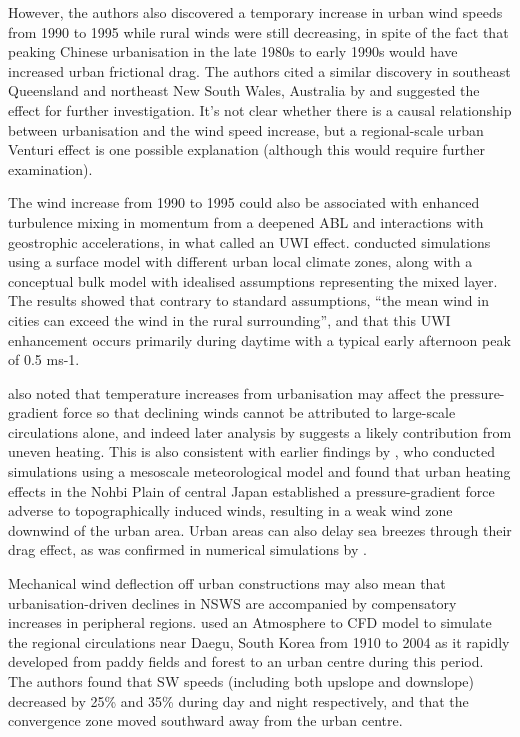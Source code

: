 However, the authors also discovered a temporary increase in urban wind speeds from 1990 to 1995 while rural winds were still decreasing, in spite of the fact that peaking Chinese urbanisation in the late 1980s to early 1990s would have increased urban frictional drag. The authors cited a similar discovery in southeast Queensland and northeast New South Wales, Australia by \citet{mcvicar2008} and suggested the effect for further investigation. It’s not clear whether there is a causal relationship between urbanisation and the wind speed increase, but a regional-scale urban Venturi effect is one possible explanation (although this would require further examination).

The wind increase from 1990 to 1995 could also be associated with enhanced turbulence mixing in momentum from a deepened \ac{ABL} and interactions with geostrophic accelerations, in what \citet{droste2018} called an \acf{UWI} effect. \citet{droste2018} conducted simulations using a surface model with different urban local climate zones, along with a conceptual bulk model with idealised assumptions representing the mixed layer. The results showed that contrary to standard assumptions, “the mean wind in cities can exceed the wind in the rural surrounding”, and that this \ac{UWI} enhancement occurs primarily during daytime with a typical early afternoon peak of 0.5 ms-1.

\citet{guo2011} also noted that temperature increases from urbanisation may affect the pressure-gradient force so that declining winds cannot be attributed to large-scale circulations alone, and indeed later analysis by \citet{zhang2021} suggests a likely contribution from uneven heating. This is also consistent with earlier findings by \citet{kitada1998}, who conducted simulations using a mesoscale meteorological model and found that urban heating effects in the Nohbi Plain of central Japan established a pressure-gradient force adverse to topographically induced winds, resulting in a weak wind zone downwind of the urban area. Urban areas can also delay sea breezes through their drag effect, as was confirmed in numerical simulations by \citet{rajeswari2022}.

Mechanical wind deflection off urban constructions may also mean that urbanisation-driven declines in NSWS are accompanied by compensatory increases in peripheral regions. \citet{koo2010} used an Atmosphere to \ac{CFD} model to simulate the regional circulations near Daegu, South Korea from 1910 to 2004 as it rapidly developed from paddy fields and forest to an urban centre during this period. The authors found that \ac{SW} speeds (including both upslope and downslope) decreased by 25\% and 35\% during day and night respectively, and that the convergence zone moved southward away from the urban centre.

